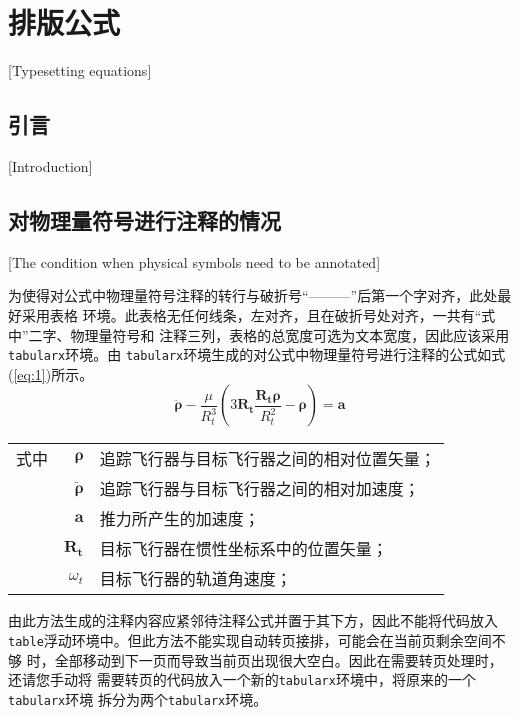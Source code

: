 
\chapter{排版公式}[Typesetting equations]

\section{引言}[Introduction]

\lipsum[1]

\section{对物理量符号进行注释的情况}[The condition when physical symbols
  need to be annotated]

为使得对公式中物理量符号注释的转行与破折号“———”后第一个字对齐，此处最好采用表格
环境。此表格无任何线条，左对齐，且在破折号处对齐，一共有“式中”二字、物理量符号和
注释三列，表格的总宽度可选为文本宽度，因此应该采用\verb|tabularx|环境。由
\verb|tabularx|环境生成的对公式中物理量符号进行注释的公式如式(\ref{eq:1})所示。
\begin{equation}\label{eq:1}
	\ddot{\bm{\rho}}-\frac{\mu}{R_{t}^{3}}\left(3\bm{R_{t}}\frac{\bm{R_{t}\rho}}{R_{t}^{2}}-\bm{\rho}\right)=\bm{a}
\end{equation}
\begin{tabularx}{\textwidth}{@{}l@{\quad}r@{———}X@{}}
	式中 & $\bm{\rho}$        & 追踪飞行器与目标飞行器之间的相对位置矢量； \\
	   & $\bm{\ddot{\rho}}$ & 追踪飞行器与目标飞行器之间的相对加速度；  \\
	   & $\bm{a}$           & 推力所产生的加速度；            \\
	   & $\bm{R_t}$         & 目标飞行器在惯性坐标系中的位置矢量；    \\
	   & $\omega_{t}$       & 目标飞行器的轨道角速度；          \\
\end{tabularx}\vspace{3.15bp}
由此方法生成的注释内容应紧邻待注释公式并置于其下方，因此不能将代码放入
\verb|table|浮动环境中。但此方法不能实现自动转页接排，可能会在当前页剩余空间不够
时，全部移动到下一页而导致当前页出现很大空白。因此在需要转页处理时，还请您手动将
需要转页的代码放入一个新的\verb|tabularx|环境中，将原来的一个\verb|tabularx|环境
拆分为两个\verb|tabularx|环境。

